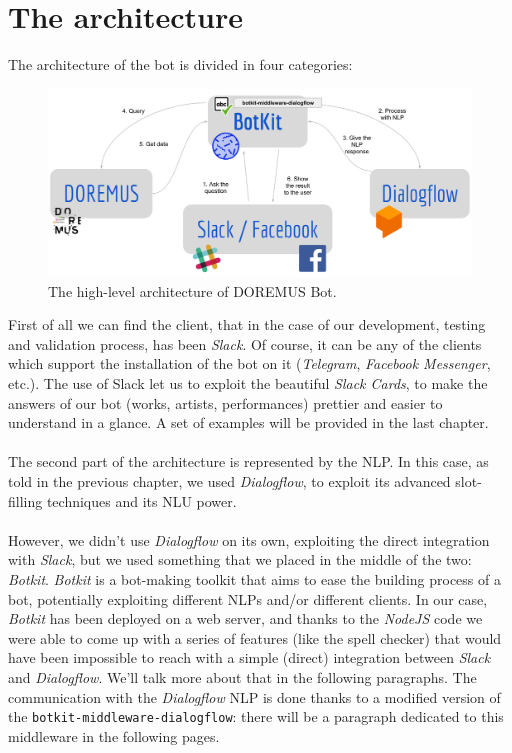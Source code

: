 \documentclass[a4paper,12pt]{report}
\begin{document}
	\section{The architecture}
	The architecture of the bot is divided in four categories:
	\begin{figure}[H]
		\centering
		\includegraphics[scale=0.2]{arch2}
		\caption{The high-level architecture of DOREMUS Bot.}
	\end{figure}
	First of all we can find the client, that in the case of our development, testing and validation process, has been \textit{Slack}. Of course, it can be any of the clients which support the installation of the bot on it (\textit{Telegram}, \textit{Facebook Messenger}, etc.). The use of Slack let us to exploit the beautiful \textit{Slack Cards}, to make the answers of our bot (works, artists, performances) prettier and easier to understand in a glance. A set of examples will be provided in the last chapter.\\\\
	The second part of the architecture is represented by the NLP. In this case, as told in the previous chapter, we used \textit{Dialogflow}, to exploit its advanced slot-filling techniques and its NLU power.\\\\
	However, we didn't use \textit{Dialogflow} on its own, exploiting the direct integration with \textit{Slack}, but we used something that we placed in the middle of the two: \textit{Botkit}. \textit{Botkit} is a bot-making toolkit that aims to ease the building process of a bot, potentially exploiting different NLPs and/or different clients. In our case, \textit{Botkit} has been deployed on a web server, and thanks to the \textit{NodeJS} code we were able to come up with a series of features (like the spell checker) that would have been impossible to reach with a simple (direct) integration between \textit{Slack} and \textit{Dialogflow}. We'll talk more about that in the following paragraphs. The communication with the \textit{Dialogflow} NLP is done thanks to a modified version of the \texttt{botkit-middleware-dialogflow}\cite{bmd}: there will be a paragraph dedicated to this middleware in the following pages.\\\\
\end{document}
